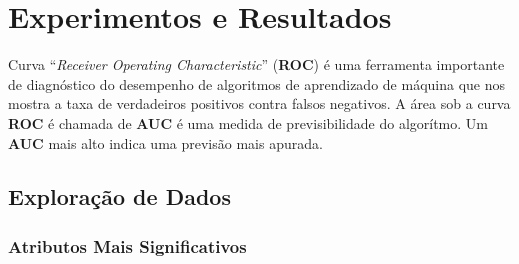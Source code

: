 \documentclass[twoside]{article}
\begin{document}
\section{Experimentos e Resultados}

Curva ``\textit{Receiver Operating Characteristic}'' (\textbf{ROC}) é uma ferramenta importante de diagnóstico do desempenho de algoritmos de aprendizado de máquina que nos mostra a taxa de verdadeiros positivos contra falsos negativos. A área sob a curva \textbf{ROC} é chamada de \textbf{AUC} é uma medida de previsibilidade do algorítmo. Um \textbf{AUC} mais alto indica uma previsão mais apurada.

\subsection{Exploração de Dados}

\subsubsection{Atributos Mais Significativos}
\end{document}
